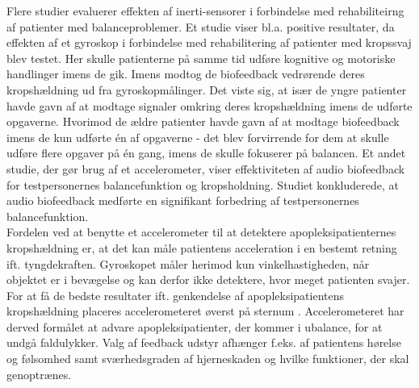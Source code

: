 Flere studier evaluerer effekten af inerti-sensorer i forbindelse med rehabiliteirng af patienter med balanceproblemer. Et studie viser bl.a. positive resultater, da effekten af et gyroskop i forbindelse med rehabilitering af patienter med kropssvaj blev testet. Her skulle patienterne på samme tid udføre kognitive og motoriske handlinger imens de gik. Imens modtog de biofeedback vedrørende deres kropshældning ud fra gyroskopmålinger. Det viste sig, at især de yngre patienter havde gavn af at modtage signaler omkring deres kropshældning imens de udførte opgaverne. Hvorimod de ældre patienter havde gavn af at modtage biofeedback imens de kun udførte én af opgaverne - det blev forvirrende for dem at skulle udføre flere opgaver på én gang, imens de skulle fokuserer på balancen. Et andet studie, der gør brug af et accelerometer, viser effektiviteten af audio biofeedback for testpersonernes balancefunktion og kropsholdning. Studiet konkluderede, at audio biofeedback  medførte en signifikant forbedring af testpersonernes balancefunktion. \cite{Giggins2013} \\
Fordelen ved at benytte et accelerometer til at detektere apopleksipatienternes kropshældning er, at det kan måle patientens acceleration i en bestemt retning ift. tyngdekraften. Gyroskopet måler herimod kun vinkelhastigheden, når objektet er i bevægelse og kan derfor ikke detektere, hvor meget patienten svajer. For at få de bedste resultater ift. genkendelse af apopleksipatientens kropshældning placeres accelerometeret øverst på sternum \cite{Gjoreski2011}. Accelerometeret har derved formålet at advare apopleksipatienter, der kommer i ubalance, for at undgå faldulykker. 
Valg af feedback udstyr afhænger f.eks. af patientens hørelse og følsomhed samt sværhedsgraden af hjerneskaden og hvilke funktioner, der skal genoptrænes. \cite{Hjaelpemiddelbasen}

